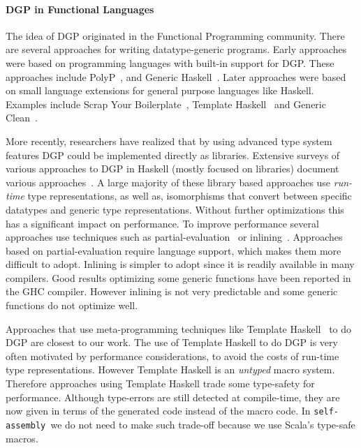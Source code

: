 \documentclass[preprint,nocopyrightspace]{sigplanconf}
\newcommand{\selfassembly}{\texttt{self-assembly~}}
\begin{document}
\paragraph{DGP in Functional Languages}
The idea of DGP originated in the Functional Programming community.
There are several approaches for writing datatype-generic
programs. Early approaches were based on programming languages with
built-in support for DGP. These approaches include PolyP~\cite{PolyPJansson},
and Generic Haskell~\cite{GenericHaskell}. Later approaches were
based on small language extensions for general purpose languages like
Haskell. Examples include Scrap Your Boilerplate~\cite{SYB}, Template
Haskell~\cite{template-haskell} and Generic Clean~\cite{GenericClean}.

More recently, researchers have realized that by using advanced type
system features DGP could be implemented directly as
libraries. Extensive surveys of various approaches to DGP in Haskell
(mostly focused on libraries) document various
approaches~\cite{ComparingGPHaskellRodriquez,ComparingGPHaskellHinze}. A
large majority of these library based approaches use \emph{run-time}
type representations, as well as, isomorphisms that convert between
specific datatypes and generic type representations. Without further
optimizations this has a significant impact on performance. To improve
performance several approaches use techniques such as
partial-evaluation~\cite{DGPPartial} or inlining~\cite{OptimizingDGP}.
Approaches based on partial-evaluation require language support, which
makes them more difficult to adopt. Inlining is simpler to adopt since
it is readily available in many compilers.  Good results optimizing
some generic functions have been reported in the GHC compiler. However
inlining is not very predictable and some generic functions do not
optimize well.

Approaches that use meta-programming techniques like Template
Haskell~\cite{TemplateYourBoilerplate} to do DGP are closest to our work.
The use of Template Haskell to do
DGP is very often motivated by performance considerations, to avoid the
costs of run-time type representations. However Template Haskell is an
\emph{untyped} macro system. Therefore approaches using Template
Haskell trade some type-safety for performance. Although type-errors
are still detected at compile-time, they are now given in terms of the
generated code instead of the macro code. In \selfassembly we do not
need to make such trade-off because we use Scala's type-safe macros.
\end{document}
